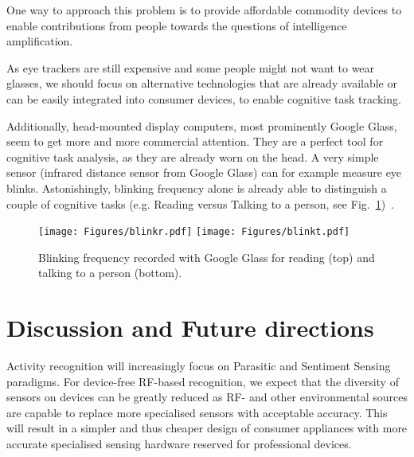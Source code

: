 \documentclass[journal]{IEEEtran}
\begin{document}
\begin{figure*}
One way to approach this problem is to provide affordable commodity devices to enable contributions from people towards the questions of intelligence amplification.

As eye trackers are still expensive and some people might not want to wear glasses, we should focus on alternative technologies that are already available or can be easily integrated into consumer devices, to enable cognitive task tracking.

Additionally, head-mounted display computers, most prominently Google Glass, seem to get more and more commercial attention. 
They are a perfect tool for cognitive task analysis, as they are already worn on the head. 
A very simple sensor (infrared distance sensor from Google Glass) can for example measure eye blinks. 
Astonishingly, blinking frequency alone is already able to distinguish a couple of cognitive tasks (e.g. Reading versus Talking to a person, see Fig.~\ref{blink})~\cite{ishimaru2014blink}.
\begin{figure}
    \centering
    \texttt{[image: Figures/blinkr.pdf]}
    \texttt{[image: Figures/blinkt.pdf]}
   \caption{Blinking frequency recorded with Google Glass for reading (top) and talking to a person (bottom).}
   \label{blink}
\end{figure} 



























\section{Discussion and Future directions}\label{sectionFuture}
Activity recognition will increasingly focus on Parasitic and Sentiment Sensing paradigms. 
For device-free RF-based recognition, we expect that the diversity of sensors on devices can be greatly reduced as RF- and other environmental sources are capable to replace more specialised sensors with acceptable accuracy.
This will result in a simpler and thus cheaper design of consumer appliances with more accurate specialised sensing hardware reserved for professional devices.


\end{figure*}
\end{document}
